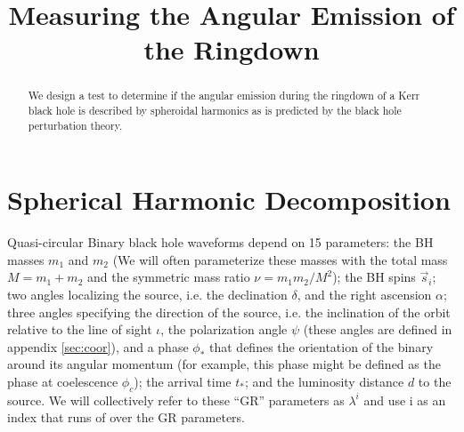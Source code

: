 \documentclass[aps,prd,amsmath,showpacs,amssymb,superscriptaddress,nofootinbib,longbibliography,eqsecnum,preprintnumbers]{revtex4-1}
\newcommand{\Caltech}{\affiliation{Theoretical Astrophysics 350-17, California Institute of Technology, Pasadena, CA 91125}}
\begin{document}
\title{Measuring the Angular Emission of the Ringdown}
\begin{abstract}
We design a test to determine if the angular emission during the ringdown of a Kerr black hole is described by spheroidal harmonics as is predicted by the black hole perturbation theory. 
\end{abstract}
\maketitle
\tableofcontents

\section{Spherical Harmonic Decomposition}

Quasi-circular Binary black hole waveforms depend on 15 parameters: the BH masses $m_1$ and $m_2$ (We will often parameterize these masses with the total mass $M=m_1+m_2$ and the symmetric mass ratio $\nu =m_1m_2/M^2$); the BH spins $\vec s_i$; two angles localizing the source, i.e. the declination $\delta$, and the right ascension $\alpha$; three angles specifying the direction of the source, i.e. the inclination of the orbit relative to the line of sight $\iota$, the polarization angle $\psi$ (these angles are defined in appendix \ref{sec:coor}), and a phase $\phi_*$ that defines the orientation of the binary around its angular momentum (for example, this phase might be defined as the phase at coelescence $\phi_c$); the arrival time $t_*$; and the luminosity distance $d$ to the source. We will collectively refer to these ``GR'' parameters as $\lambda^i$ and use i as an index that runs of over the GR parameters. 
\end{document}
